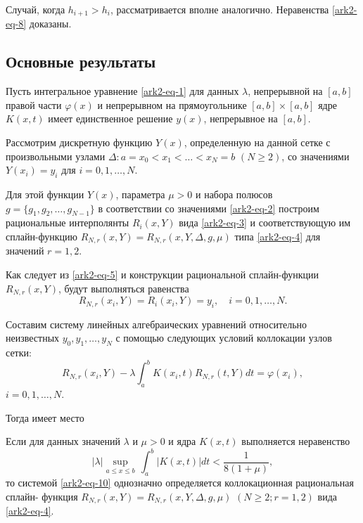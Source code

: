 Случай, когда $h_{i+1}>h_i$, рассматривается вполне аналогично. Неравенства
\eqref{ark2-eq-8} доказаны.


\subsection{Основные результаты}

Пусть интегральное уравнение \eqref{ark2-eq-1} для данных $\lambda$, непрерывной
на $[a,b]$ правой части $\varphi(x)$ и непрерывном на прямоугольнике $[a,b]\times [a,b]$
ядре $K(x,t)$ имеет единственное решение $y(x)$, непрерывное на $[a,b]$.

Рассмотрим дискретную функцию $Y(x)$, определенную на данной сетке с произвольными узлами
$\Delta: a=x_0<x_1<\dots<x_N=b$ $(N\geqslant 2)$, со значениями
$Y(x_i)=y_i$ для $i=0,1,\dots,N$.

Для этой функции $Y(x)$, параметра $\mu>0$ и набора полюсов $g=\{g_1,g_2,\dots,g_{N-1}\}$
в соответствии со значениями \eqref{ark2-eq-2} построим рациональные интерполянты $R_i(x,Y)$ вида \eqref{ark2-eq-3}
и соответствующую им сплайн-функцию
$R_{N,r}(x,Y)=R_{N,r}(x,Y,\Delta,g,\mu)$ типа \eqref{ark2-eq-4} для значений $r=1,2$.

Как следует из \eqref{ark2-eq-5} и конструкции рациональной сплайн-функции $R_{N,r}(x,Y)$,
будут выполняться равенства
\begin{equation}\label{ark2-eq-9}
R_{N,r}(x_i,Y)=R_i(x_i,Y)=y_i,\quad i=0,1,\dots,N.
\end{equation}

Составим систему линейных алгебраических уравнений относительно неизвестных
$y_0,y_1,\dots,y_N$ с помощью следующих условий коллокации узлов сетки:
\begin{equation}\label{ark2-eq-10}
R_{N,r}(x_i,Y)-\lambda \int_a^b K(x_i,t)R_{N,r}(t,Y)dt=\varphi(x_i),
\end{equation}
$i=0,1,\dots,N$.

Тогда имеет место

\begin{theorem}\label{teor1}
Если для данных значений $\lambda$ и $\mu>0$ и ядра $K(x,t)$ выполняется неравенство
\begin{equation}\label{ark2-eq-11}
|\lambda| \sup_{a\leqslant x\leqslant b} \,\int_a^b |K(x,t)|dt<\frac 1{8(1+\mu)},
\end{equation}
то системой \eqref{ark2-eq-10} однозначно определяется коллокационная рациональная сплайн- функция
$R_{N,r}(x,Y)=R_{N,r}(x,Y,\Delta,g,\mu)$ $(N\geqslant 2; r=1,2)$ вида \eqref{ark2-eq-4}.
 \end{theorem}

